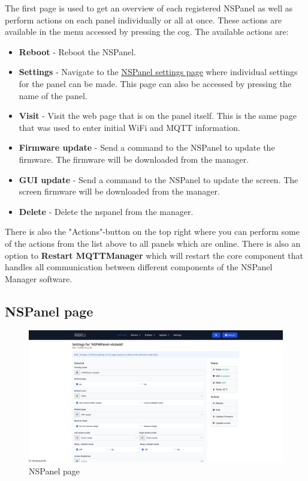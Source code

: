 \documentclass[10pt]{article}
\begin{document}
    The first page is used to get an overview of each registered NSPanel as well as perform actions on each panel individually or all at once. These actions are available in the menu accessed by pressing the cog. The available actions are:
    \begin{itemize}
      \item \textbf{Reboot} - Reboot the NSPanel.
      \item \textbf{Settings} - Navigate to the \hyperref[sec:nspanel_page]{NSPanel settings page} where individual settings for the panel can be made. This page can also be accessed by pressing the name of the panel.
      \item \textbf{Visit} - Visit the web page that is on the panel itself. This is the same page that was used to enter initial WiFi and MQTT information.
      \item \textbf{Firmware update} - Send a command to the NSPanel to update the firmware. The firmware will be downloaded from the manager.
      \item \textbf{GUI update} - Send a command to the NSPanel to update the screen. The screen firmware will be downloaded from the manager.
      \item \textbf{Delete} - Delete the nspanel from the manager.
    \end{itemize}

    There is also the "Actions"-button on the top right where you can perform some of the actions from the list above to all panels which are online. There is also an option to \textbf{Restart MQTTManager} which will restart the 
    core component that handles all communication between different components of the NSPanel Manager software.

    \hypertarget{sec:nspanel_page}{}
    \subsection{NSPanel page}
    \label{sec:nspanel_page}
    \begin{figure}[H]
    \centering
    \includegraphics[scale=0.25,keepaspectratio]{nspanel_page.png}
    \caption{NSPanel page}%
    \end{figure}
\end{document}
